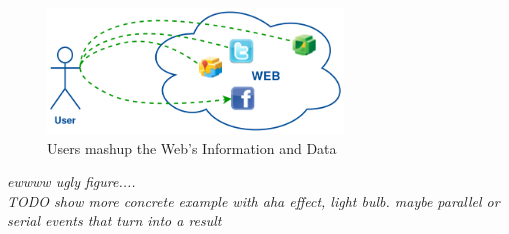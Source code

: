 \begin{figure}[!ht]
  \centering
  \includegraphics[width=0.7\textwidth]{figures/UsersWeildServicesInTheWeb}
  \caption{Users mashup the Web's Information and Data}
  \label{fig:UsersWeildServicesInTheWeb}
\end{figure}
\textit{\small{ewwww ugly figure....\\
TODO show more concrete example with aha effect, light bulb. maybe parallel or serial events that turn into a result}}


